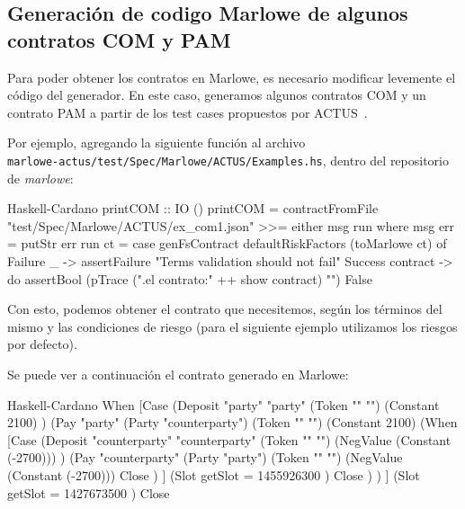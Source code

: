 \documentclass[12pt]{book}
\begin{document}
\subsection{Generación de codigo Marlowe de algunos contratos COM y PAM}
Para poder obtener los contratos en Marlowe, es necesario modificar levemente el código del generador. En este caso, generamos algunos contratos COM y un contrato PAM a partir de los test cases propuestos por ACTUS~\cite{ACTUS_Tests}.

Por ejemplo, agregando la siguiente función al archivo\\ \texttt{marlowe-actus/test/Spec/Marlowe/ACTUS/Examples.hs}, dentro del repositorio de \textit{marlowe}:

\begin{code}[title=Función para imprimir contratos en Marlowe.]{Haskell-Cardano}
printCOM :: IO ()
printCOM =
  contractFromFile "test/Spec/Marlowe/ACTUS/ex_com1.json"
    >>= either msg run
  where
    msg err = putStr err
    run ct = case genFsContract defaultRiskFactors (toMarlowe ct) of
      Failure _ -> assertFailure "Terms validation should not fail"
      Success contract -> do
          assertBool (pTrace (".\n\nMostrando el contrato:\n\n" ++ show contract) "") False
\end{code}

Con esto, podemos obtener el contrato que necesitemos, según los términos del mismo y las condiciones de riesgo (para el siguiente ejemplo utilizamos los riesgos por defecto).

Se puede ver a continuación el contrato generado en Marlowe:

\begin{code}[title=Contrato COM4 en Marlowe.]{Haskell-Cardano}
When
    [Case
        (Deposit "party" "party"
            (Token "" "")
            (Constant 2100)
        )
        (Pay "party"
            (Party "counterparty")
            (Token "" "")
            (Constant 2100)
            (When
                [Case
                    (Deposit "counterparty" "counterparty"
                        (Token "" "")
                        (NegValue (Constant (-2700)))
                    )
                    (Pay "counterparty"
                        (Party "party")
                        (Token "" "")
                        (NegValue (Constant (-2700))) 
                        Close
                    )
                ]
                (Slot { getSlot = 1455926300 })
                Close
            )
        )
    ]
    (Slot { getSlot = 1427673500 })
    Close
\end{code}
\end{document}
